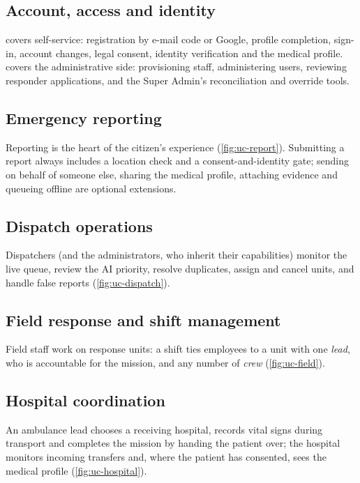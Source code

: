 \subsection{Account, access and identity}
 covers self-service: registration by e-mail code or Google, profile completion, sign-in,
account changes, legal consent, identity verification and the medical profile.  covers the
administrative side: provisioning staff, administering users, reviewing responder applications, and the
Super Admin's reconciliation and override tools.

\subsection{Emergency reporting}
Reporting is the heart of the citizen's experience (\cref{fig:uc-report}). Submitting a report always includes a
location check and a consent-and-identity gate; sending on behalf of someone else, sharing the medical profile,
attaching evidence and queueing offline are optional extensions.

\subsection{Dispatch operations}
Dispatchers (and the administrators, who inherit their capabilities) monitor the live queue, review the AI
priority, resolve duplicates, assign and cancel units, and handle false reports (\cref{fig:uc-dispatch}).

\subsection{Field response and shift management}
Field staff work on response units: a shift ties employees to a unit with one \emph{lead}, who is accountable
for the mission, and any number of \emph{crew} (\cref{fig:uc-field}).

\subsection{Hospital coordination}
An ambulance lead chooses a receiving hospital, records vital signs during transport and completes the mission by
handing the patient over; the hospital monitors incoming transfers and, where the patient has consented, sees the
medical profile (\cref{fig:uc-hospital}).

